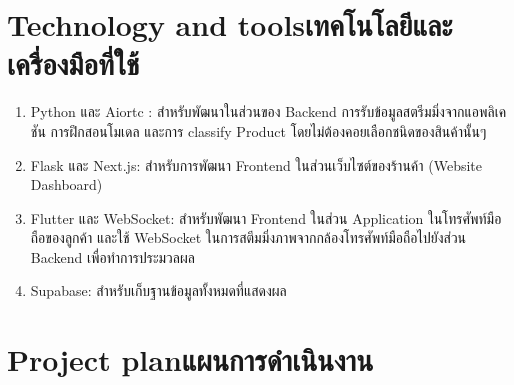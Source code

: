 \section{\ifenglish Technology and tools\else เทคโนโลยีและเครื่องมือที่ใช้\fi}
\begin{enumerate}
    \item Python และ Aiortc : สำหรับพัฒนาในส่วนของ Backend การรับข้อมูลสตรีมมิ่งจากแอพลิเคชัน การฝึกสอนโมเดล และการ classify Product
    โดยไม่ต้องคอยเลือกชนิดของสินค้านั้นๆ
    \item Flask และ Next.js: สําหรับการพัฒนา Frontend ในส่วนเว็บไซต์ของร้านค้า (Website Dashboard)
    \item Flutter และ WebSocket: สำหรับพัฒนา Frontend  ในส่วน Application ในโทรศัพท์มือถือของลูกค้า และใช้ WebSocket ในการสตีมมิ่งภาพจากกล้องโทรศัพท์มือถือไปยังส่วน Backend เพื่อทำการประมวลผล
    \item Supabase: สําหรับเก็บฐานข้อมูลทั้งหมดที่แสดงผล

\end{enumerate}



\section{\ifenglish Project plan\else แผนการดำเนินงาน\fi}
%  
    
